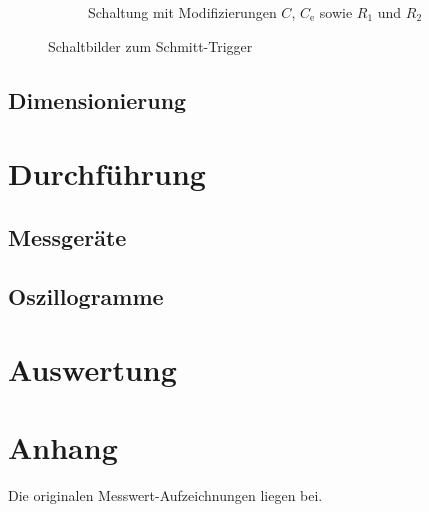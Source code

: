 \documentclass[numbers=noenddot,10pt,a4paper]{scrartcl}
\newcommand{\ix}[1]{_\text{#1}}
\begin{document}
\begin{figure}[H]
\begin{subfigure}[b]{0.49\textwidth}
\caption{Schaltung mit Modifizierungen $C$, $C\ix{e}$ sowie $R_1$ und $R_2$}
\end{subfigure}
\caption{Schaltbilder zum Schmitt-Trigger}
\end{figure}
\subsection{Dimensionierung}
\section{Durchführung}
\subsection{Messgeräte}
\subsection{Oszillogramme}
\section{Auswertung}
\section{Anhang}
Die originalen Messwert-Aufzeichnungen liegen bei.
\end{document}
